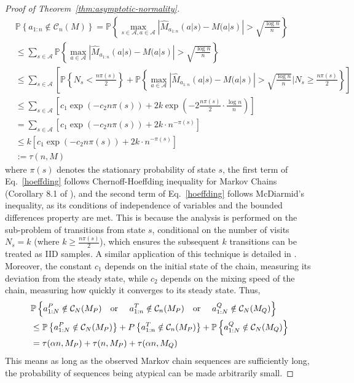\documentclass{article}
\theoremstyle{plain}
\theoremstyle{definition}
\theoremstyle{remark}
\begin{document}
\begin{proof}[Proof of Theorem~\ref{thm:asymptotic-normality}]
\begin{align}
    &\mathbb P\left\{ a_{1:n} \notin \mathcal{C}_n(M) \right\} = \mathbb P\left\{   \max_{s\in \mathcal{A}, a\in \mathcal{A}}|\hat{M}_{a_{1:n}}(a|s)-M(a|s)|> \sqrt{\frac{\log n}{n}} \right\} \\
    & \le \sum_{s \in \mathcal{A}} \mathbb P\left\{ \max_{a \in \mathcal{A}} |\hat{M}_{a_{1:n}}(a|s)-M(a|s)| >\sqrt{\frac{\log n}{n}} \right\} \\
    & \le \sum_{s \in \mathcal{A}} \left[\mathbb P\left\{N_s < \frac{n\pi (s)}{2} \right\} + \mathbb P\left\{\max_{a \in \mathcal{A}} |\hat{M}_{a_{1:n}}(a|s)-M(a|s)| >\sqrt{\frac{\log n}{n}} \bigg|N_s \ge \frac{n\pi (s)}{2}\right\}\right] \\
    & \le   \sum_{s \in \mathcal{A}} \left[c_1 \exp(-c_2n\pi(s))+  2k \exp(-2\frac{n\pi(s)}{2}\cdot\frac{\log n}{n})   \right] \label{hoeffding}\\
    & =    \sum_{s \in \mathcal{A}} \left[c_1 \exp(-c_2n\pi(s))+2k \cdot n^{-\pi(s)}\right] \\
    &\le k \left[c_1 \exp(-c_2n\pi(s))+2k\cdot n^{-\pi(s)}\right] \\
    &:=\tau(n,M)
\end{align}
where $\pi(s)$ denotes the stationary probability of state $s$, the first term of Eq.~\ref{hoeffding} follows Chernoff-Hoeffding inequality for Markov Chains (Corollary 8.1 of \cite{wolfer2023empiricalinstancedependentestimationmarkov}), and the second term of Eq.~\ref{hoeffding} follows McDiarmid's inequality, as its conditions of independence of variables and the bounded differences property are met. This is because the analysis is performed on the sub-problem of transitions from state $s$, conditional on the number of visits $N_s=k$ (where $k\ge \frac{n \pi(s)}{2}$), which ensures the subsequent $k$ transitions can be treated as IID samples. A similar application of this technique is detailed in \cite{wolfer2023empiricalinstancedependentestimationmarkov}. Moreover, the constant $c_1$ depends on the initial state of the chain, measuring its deviation from the steady state, while $c_2$ depends on the mixing speed of the chain, measuring how quickly it converges to its steady state. Thus,
\begin{align}
    &\mathbb P\left\{ a^P_{1:N} \notin \mathcal{C}_N (M_P) \text{\quad or \quad} a^T_{1:n} \notin \mathcal{C}_n (M_P) \text{\quad or \quad} a^Q_{1:N} \notin \mathcal{C}_N (M_Q)\right\} \\
    &\leq \mathbb P\left\{ a^P_{1:N} \notin \mathcal{C}_N (M_P) \right\}+ P\left\{ a^T_{1:n} \notin \mathcal{C}_n (M_P) \right\}+\mathbb P\left\{ a^Q_{1:N} \notin \mathcal{C}_N (M_Q)\right\} \\
    & = \tau(\alpha n,M_P)+ \tau(n,M_P)+ \tau(\alpha n,M_Q)
\end{align}
This means as long as the observed Markov chain sequences are sufficiently long, the probability of sequences being atypical can be made arbitrarily small.



\end{proof}
\end{document}
